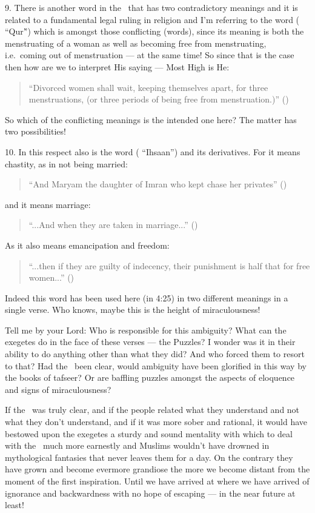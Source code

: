 \documentclass[12pt]{memoir}
\begin{document}
9. There is another word in the \Quran\ that has two
contradictory meanings and it is related to a fundamental legal ruling
in religion and I’m referring to the word ( “Qur\`”)
which is amongst those conflicting (words),
since its meaning is both the menstruating of a woman
as well as becoming free from menstruating,
i.e.\ coming out of menstruation — at the same time!
So since that is the case then how are we to interpret His saying —
Most High is He:

\begin{quote}
“Divorced women shall wait, keeping themselves apart,
for three menstruations, (or three periods of being free from menstruation.)”
()
\end{quote}

So which of the conflicting meanings is the intended one here?
The matter has two possibilities!

10. In this respect also is the word ( “Ihsaan”)
and its derivatives.
For it means chastity, as in not being married:

\begin{quote}
“And Maryam the daughter of \´Imran who kept chase her privates”
()
\end{quote}

and it means marriage:

\begin{quote}
“...And when they are taken in marriage...” ()
\end{quote}

As it also means emancipation and freedom:

\begin{quote}
“...then if they are guilty of indecency,
their punishment is half that for free women...” ()
\end{quote}

Indeed this word has been used here (in 4:25)
in two different meanings in a single verse.
Who knows, maybe this is the height of miraculousness!

Tell me by your Lord: Who is responsible for this ambiguity?
What can the exegetes do in the face of these verses — the Puzzles?
I wonder was it in their ability to do anything other than what they did?
And who forced them to resort to that? Had the \Quran\ been clear,
would ambiguity have been glorified in this way by the books of tafseer?
Or are baffling puzzles amongst the aspects of eloquence
and signs of miraculousness?

If the \Quran\ was truly clear, and if the people related
what they understand and not what they don’t understand,
and if it was more sober and rational,
it would have bestowed upon the exegetes a sturdy and sound mentality
with which to deal with the \Quran\ much more earnestly
and Muslims wouldn’t have drowned in mythological fantasies
that never leaves them for a day.
On the contrary they have grown and become evermore grandiose
the more we become distant from the moment of the first inspiration.
Until we have arrived at where we have arrived of ignorance and backwardness
with no hope of escaping — in the near future at least!
\end{document}
